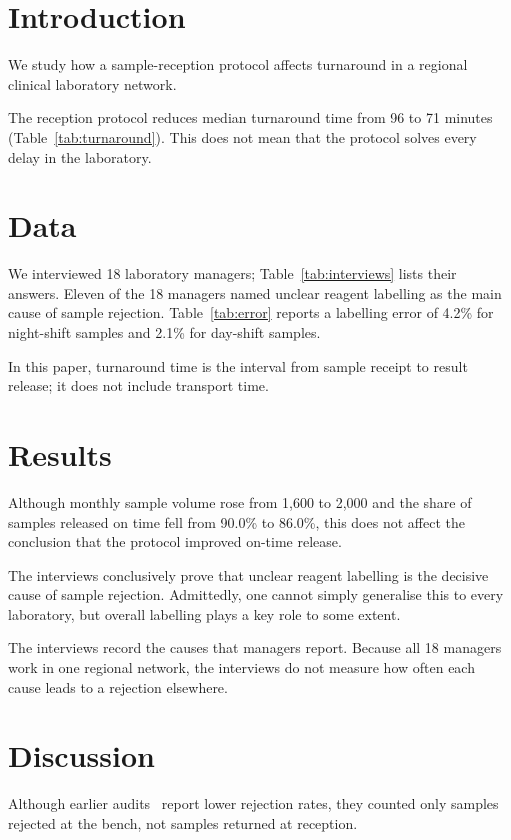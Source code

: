 \documentclass{article}
\begin{document}
\section{Introduction}
We study how a sample-reception protocol affects turnaround in a regional clinical laboratory network.

The reception protocol reduces median turnaround time from 96 to 71 minutes (Table~\ref{tab:turnaround}).
This does not mean that the protocol solves every delay in the laboratory.

\section{Data}
We interviewed 18 laboratory managers; Table~\ref{tab:interviews} lists their answers.
Eleven of the 18 managers named unclear reagent labelling as the main cause of sample rejection.
Table~\ref{tab:error} reports a labelling error of 4.2\% for night-shift samples and 2.1\% for day-shift samples.

In this paper, turnaround time is the interval from sample receipt to result release; it does not include transport time.

\section{Results}
Although monthly sample volume rose from 1,600 to 2,000 and the share of samples released on time fell from 90.0\% to 86.0\%, this does not affect the conclusion that the protocol improved on-time release.

The interviews conclusively prove that unclear reagent labelling is the decisive cause of sample rejection.
Admittedly, one cannot simply generalise this to every laboratory, but overall labelling plays a key role to some extent.

The interviews record the causes that managers report.
Because all 18 managers work in one regional network, the interviews do not measure how often each cause leads to a rejection elsewhere.

\section{Discussion}
Although earlier audits~\cite{audit2019} report lower rejection rates, they counted only samples rejected at the bench, not samples returned at reception.
\end{document}
